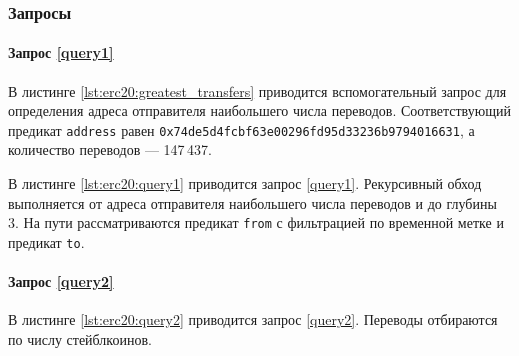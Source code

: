 \subsubsection{Запросы}

\paragraph{Запрос \ref{query1}}

В листинге \ref{lst:erc20:greatest_transfers} приводится вспомогательный запрос для определения адреса отправителя
наибольшего числа переводов. Соответствующий предикат \texttt{address} равен
\texttt{0x74de5d4fcbf63e00296fd95d33236b9794016631}, а количество переводов --- 147\,437.


В листинге \ref{lst:erc20:query1} приводится запрос \ref{query1}. Рекурсивный обход выполняется от адреса отправителя
наибольшего числа переводов и до глубины 3. На пути рассматриваются предикат \texttt{from} с фильтрацией по временной
метке и предикат \texttt{to}.


\paragraph{Запрос \ref{query2}}

В листинге \ref{lst:erc20:query2} приводится запрос \ref{query2}. Переводы отбираются по числу стейблкоинов.


